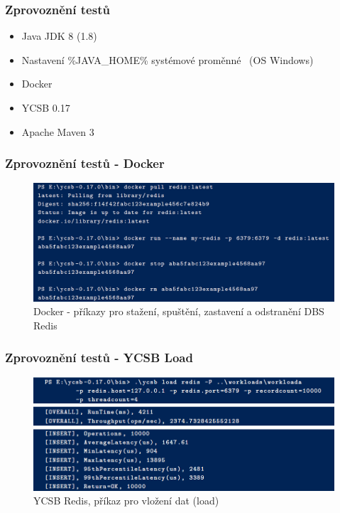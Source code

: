 \documentclass{beamer}
\begin{document}
	\begin{frame}
		\frametitle{Zprovoznění testů}
		\begin{itemize}
			\item Java JDK 8 (1.8)~{\footnotesize\cite{java-jdk}}
			\item Nastavení \%JAVA\_HOME\% systémové proměnné~{\footnotesize\cite{win-env-var}} {\footnotesize(OS Windows)}
			\item Docker~{\footnotesize\cite{docker}}
			\item YCSB 0.17~{\footnotesize\cite{ycsb-download}}
			\item Apache Maven 3~{\footnotesize\cite{maven}}
			
		\end{itemize}
	\end{frame}

	\begin{frame}
		\frametitle{Zprovoznění testů - Docker}
		\begin{figure}
			\centering
			\includegraphics[scale=0.37]{Figures/docker_commands.PNG}
			\caption{Docker - příkazy pro stažení, spuštění, zastavení a odstranění DBS Redis}
		\end{figure}
	\end{frame}
	
	\begin{frame}
		\frametitle{Zprovoznění testů - YCSB Load}
		\begin{figure}
			\centering
			\includegraphics[scale=0.5]{Figures/ycsb_load_cut.PNG}
			\caption{YCSB Redis, příkaz pro vložení dat (load)}
		\end{figure}
	\end{frame}
\end{document}
